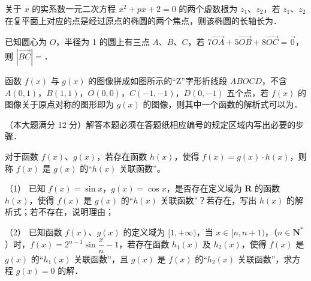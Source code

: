 \begin{question}
关于 \(x\) 的实系数一元二次方程 \(x^{2}+px+2=0\) 的两个虚数根为 \(z_{1}\)、\(z_{2}\)，若 \(z_{1}\)、\(z_{2}\) 在复平面上对应的点是经过原点的椭圆的两个焦点，则该椭圆的长轴长为\gkblank{}．

\end{question}
\begin{question}
已知圆心为 \(O\)，半径为 1 的圆上有三点 \(A\)、\(B\)、\(C\)，若 \(7\overrightarrow{OA}+5\overrightarrow{OB}+8\overrightarrow{OC}=\vec{0}\)，则 \(\left|\overrightarrow{BC}\right|=\)\gkblank{}．

\Needspace{0.4\textheight}
\end{question}
\begin{question}
函数 \(f(x)\) 与 \(g(x)\) 的图像拼成如图所示的“Z”字形折线段 \(ABOCD\)，不含 \(A(0,1)\)，\(B(1,1)\)，\(O(0,0)\)，\(C(-1,-1)\)，\(D(0,-1)\) 五个点，若 \(f(x)\) 的图像关于原点对称的图形即为 \(g(x)\) 的图像，则其中一个函数的解析式可以为\gkblank{}．
\nopagebreak[4]
\begin{center}\end{center}
\nopagebreak[4]
\end{question}

（本大题满分 12 分）解答本题必须在答题纸相应编号的规定区域内写出必要的步骤．

\begin{question}

对于函数 \(f(x)\)、\(g(x)\)，若存在函数 \(h(x)\)，使得 \(f(x)=g(x)\cdot h(x)\)，则称 \(f(x)\) 是 \(g(x)\) 的“\(h(x)\) 关联函数”。

（1） 已知 \(f(x)=\sin x\)，\(g(x)=\cos x\)，是否存在定义域为 \(\mathbf{R}\) 的函数 \(h(x)\)，使得 \(f(x)\) 是 \(g(x)\) 的“\(h(x)\) 关联函数”？若存在，写出 \(h(x)\) 的解析式；若不存在，说明理由；

（2） 已知函数 \(f(x)\)、\(g(x)\) 的定义域为 \([1,+\infty)\)，当 \(x\in[n,n+1)\)，（\(n\in\mathbf{N}^{*}\)）时，\(f(x)=2^{n-1}\sin\dfrac{x}{n}-1\)，若存在函数 \(h_{1}(x)\) 及 \(h_{2}(x)\)，使得 \(f(x)\) 是 \(g(x)\) 的“\(h_{1}(x)\) 关联函数”，且 \(g(x)\) 是 \(f(x)\) 的“\(h_{2}(x)\) 关联函数”，求方程 \(g(x)=0\) 的解．

\end{question}